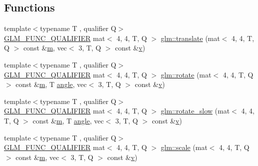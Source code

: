 \subsection*{Functions}
\begin{DoxyCompactItemize}
\item 
{\footnotesize template$<$typename T , qualifier Q$>$ }\\\hyperlink{setup_8hpp_a33fdea6f91c5f834105f7415e2a64407}{G\+L\+M\+\_\+\+F\+U\+N\+C\+\_\+\+Q\+U\+A\+L\+I\+F\+I\+ER} mat$<$ 4, 4, T, Q $>$ \hyperlink{group__gtc__matrix__transform_ga1a4ecc4ad82652b8fb14dcb087879284}{glm\+::translate} (mat$<$ 4, 4, T, Q $>$ const \&\hyperlink{_s_d_l__opengl__glext_8h_af593500c283bf1a787a6f947f503a5c2}{m}, vec$<$ 3, T, Q $>$ const \&\hyperlink{_s_d_l__opengl_8h_a10a82eabcb59d2fcd74acee063775f90}{v})
\item 
{\footnotesize template$<$typename T , qualifier Q$>$ }\\\hyperlink{setup_8hpp_a33fdea6f91c5f834105f7415e2a64407}{G\+L\+M\+\_\+\+F\+U\+N\+C\+\_\+\+Q\+U\+A\+L\+I\+F\+I\+ER} mat$<$ 4, 4, T, Q $>$ \hyperlink{group__gtc__matrix__transform_gaee9e865eaa9776370996da2940873fd4}{glm\+::rotate} (mat$<$ 4, 4, T, Q $>$ const \&\hyperlink{_s_d_l__opengl__glext_8h_af593500c283bf1a787a6f947f503a5c2}{m}, T \hyperlink{_s_d_l__opengl__glext_8h_a9e06c1f76a20fed54ca742cd25cb02c4}{angle}, vec$<$ 3, T, Q $>$ const \&\hyperlink{_s_d_l__opengl_8h_a10a82eabcb59d2fcd74acee063775f90}{v})
\item 
{\footnotesize template$<$typename T , qualifier Q$>$ }\\\hyperlink{setup_8hpp_a33fdea6f91c5f834105f7415e2a64407}{G\+L\+M\+\_\+\+F\+U\+N\+C\+\_\+\+Q\+U\+A\+L\+I\+F\+I\+ER} mat$<$ 4, 4, T, Q $>$ \hyperlink{namespaceglm_ae6c0c49198a58536fac6ab580073b157}{glm\+::rotate\+\_\+slow} (mat$<$ 4, 4, T, Q $>$ const \&\hyperlink{_s_d_l__opengl__glext_8h_af593500c283bf1a787a6f947f503a5c2}{m}, T \hyperlink{_s_d_l__opengl__glext_8h_a9e06c1f76a20fed54ca742cd25cb02c4}{angle}, vec$<$ 3, T, Q $>$ const \&\hyperlink{_s_d_l__opengl_8h_a10a82eabcb59d2fcd74acee063775f90}{v})
\item 
{\footnotesize template$<$typename T , qualifier Q$>$ }\\\hyperlink{setup_8hpp_a33fdea6f91c5f834105f7415e2a64407}{G\+L\+M\+\_\+\+F\+U\+N\+C\+\_\+\+Q\+U\+A\+L\+I\+F\+I\+ER} mat$<$ 4, 4, T, Q $>$ \hyperlink{group__gtc__matrix__transform_ga05051adbee603fb3c5095d8cf5cc229b}{glm\+::scale} (mat$<$ 4, 4, T, Q $>$ const \&\hyperlink{_s_d_l__opengl__glext_8h_af593500c283bf1a787a6f947f503a5c2}{m}, vec$<$ 3, T, Q $>$ const \&\hyperlink{_s_d_l__opengl_8h_a10a82eabcb59d2fcd74acee063775f90}{v})

\end{DoxyCompactItemize}
